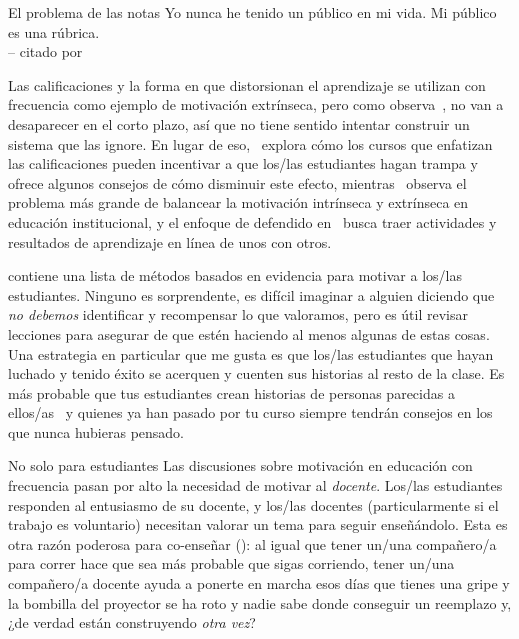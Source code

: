 \begin{aside}{El problema de las notas}
  Yo nunca he tenido un público en mi vida. Mi público es una rúbrica.\\
  -- citado por 

 Las calificaciones y la forma en que distorsionan el aprendizaje se utilizan con frecuencia como ejemplo de motivación extrínseca,
  pero como observa~\cite{Mill2016a},
  no van a desaparecer en el corto plazo,
  así que no tiene sentido intentar construir un sistema que las ignore.
  En lugar de eso,~\cite{Lang2013} explora cómo los cursos que enfatizan las calificaciones
  pueden incentivar a que los/las estudiantes hagan trampa
  y ofrece algunos consejos de cómo disminuir este efecto,
  mientras~\cite{Covi2017} observa el problema más grande de
  balancear la motivación intrínseca y extrínseca en educación institucional,
  y el enfoque de 
  defendido en~\cite{Bigg2011} busca traer actividades y resultados de aprendizaje en línea de unos con otros.
\end{aside}

\cite{Ambr2010} contiene una lista de métodos basados en evidencia para motivar a los/las estudiantes.
Ninguno es sorprendente, es
difícil imaginar a alguien diciendo que \emph{no debemos} identificar y recompensar lo que valoramos, pero
es útil revisar lecciones para asegurar de que estén haciendo al menos algunas de estas cosas.
Una estrategia en particular que me gusta es
que los/las estudiantes que hayan luchado y tenido éxito
se acerquen y cuenten sus historias al resto de la clase.
Es más probable que tus estudiantes crean historias de personas parecidas a ellos/as~\cite{Mill2016a}
y quienes ya han pasado por tu curso
siempre tendrán consejos en los que nunca hubieras pensado.

\begin{aside}{No solo para estudiantes}
  Las discusiones sobre motivación en educación con frecuencia pasan por alto la necesidad de motivar al \emph{docente}.
  Los/las estudiantes responden al entusiasmo de su docente,
  y los/las docentes (particularmente si el trabajo es voluntario) necesitan valorar un tema para seguir enseñándolo. 
  Esta es otra razón poderosa para co-enseñar ():
  al igual que tener un/una compañero/a para correr hace que sea más probable que sigas corriendo,
  tener un/una compañero/a docente ayuda a ponerte en marcha
  esos días que tienes una gripe
  y la bombilla del proyector se ha roto
  y nadie sabe donde conseguir un reemplazo
  y, ¿de verdad están construyendo \emph{otra vez}?
\end{aside}

